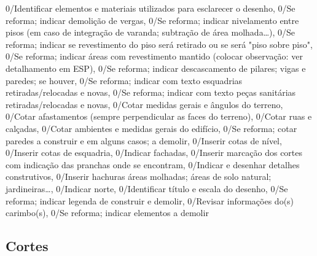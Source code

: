 \begin{anexosenv}
\begin{itemize}[leftmargin=0.4cm, itemsep=0cm]
{        0/Identificar elementos e materiais utilizados para esclarecer o desenho,
        0/Se reforma; indicar demolição de vergas,
        0/Se reforma; indicar nivelamento entre pisos (em caso de integração de varanda; subtração de área molhada…),
        0/Se reforma; indicar se revestimento do piso será retirado ou se será "piso sobre piso",
        0/Se reforma; indicar áreas com revestimento mantido (colocar observação: ver detalhamento em ESP),
        0/Se reforma; indicar descascamento de pilares; vigas e paredes; se houver,
        0/Se reforma; indicar com texto esquadrias retiradas/relocadas e novas,
        0/Se reforma; indicar com texto peças sanitárias retiradas/relocadas e novas,
        0/Cotar medidas gerais e ângulos do terreno,
        0/Cotar afastamentos (sempre perpendicular as faces do terreno),
        0/Cotar ruas e calçadas,
        0/Cotar ambientes e medidas gerais do edifício,
        0/Se reforma; cotar paredes a construir e em alguns casos; a demolir,
        0/Inserir cotas de nível,
        0/Inserir cotas de esquadria,
        0/Indicar fachadas,
        0/Inserir marcação dos cortes com indicação das pranchas onde se encontram,
        0/Indicar e desenhar detalhes construtivos,
        0/Inserir hachuras áreas molhadas; áreas de solo natural; jardineiras…,
        0/Indicar norte,
        0/Identificar título e escala do desenho,
        0/Se reforma; indicar legenda de construir e demolir,
        0/Revisar informações do(s) carimbo(s),
        0/Se reforma; indicar elementos a demolir%
        } {
        \ifnum{}
            \item[\checkedbox] 
        \else
            \item[\emptybox] 
        \fi
        
        \texto
    }
    \end{itemize}

    \subsection{Cortes}

    \noindent
    \begin{itemize}[leftmargin=0.4cm, itemsep=0cm]


\end{itemize}
\end{anexosenv}
